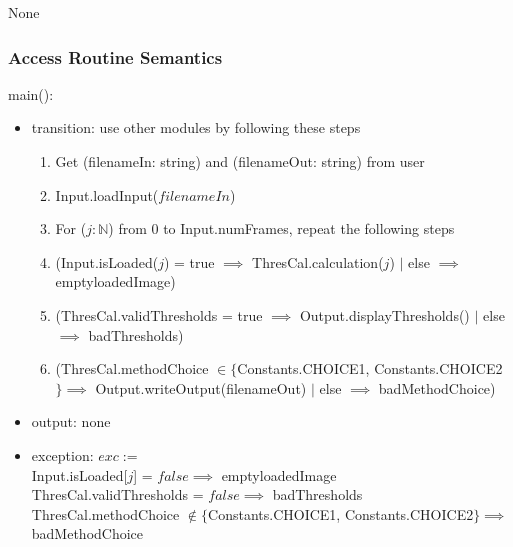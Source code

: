 \documentclass[12pt, titlepage]{article}
\begin{document}
None

\subsubsection{Access Routine Semantics}

\noindent main():
\begin{itemize}
\item transition: use other modules by following these steps
\begin{enumerate}
    \item Get (filenameIn: string) and (filenameOut: string) from user
    \item
    Input.loadInput($filenameIn$) 
    \item
    For ($j: \mathbb{N}$) from 0 to Input.numFrames, repeat the following steps
    \item
(Input.isLoaded($j$) = true $\implies$ ThresCal.calculation($j$) $|$ else
$\implies$ emptyloadedImage)
    \item
(ThresCal.validThresholds = true $\implies$ Output.displayThresholds() $|$ else
$\implies$ badThresholds) 
\item (ThresCal.methodChoice $\in \{$Constants.CHOICE1, Constants.CHOICE2$\}
\implies$ Output.writeOutput(filenameOut) $|$ else $\implies$ badMethodChoice)
\end{enumerate}
\item output: none
\item exception: $exc :=$\\
Input.isLoaded[$j$] = $false \implies$ emptyloadedImage\\
ThresCal.validThresholds = $false \implies$ badThresholds\\
ThresCal.methodChoice $\not\in \{$Constants.CHOICE1, Constants.CHOICE2$\}
\implies$ badMethodChoice
\end{itemize}

\end{document}
